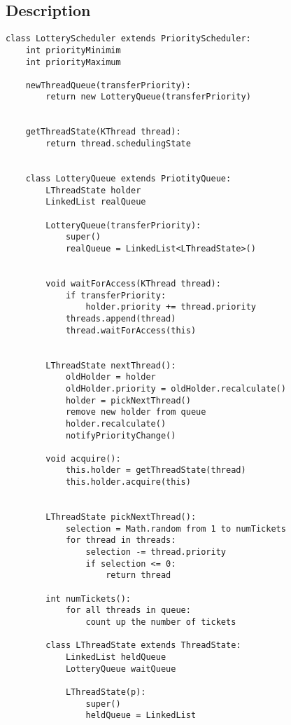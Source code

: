 \subsection{Description}
\begin{verbatim}
class LotteryScheduler extends PriorityScheduler:
    int priorityMinimim
    int priorityMaximum
    
    newThreadQueue(transferPriority):
        return new LotteryQueue(transferPriority)
    
    
    getThreadState(KThread thread):
        return thread.schedulingState
    
    
    class LotteryQueue extends PriotityQueue:
        LThreadState holder
        LinkedList realQueue
        
        LotteryQueue(transferPriority):
            super()
            realQueue = LinkedList<LThreadState>()
        
        
        void waitForAccess(KThread thread):
            if transferPriority:
                holder.priority += thread.priority          
            threads.append(thread)                              
            thread.waitForAccess(this)                          
            
        
        LThreadState nextThread():
            oldHolder = holder                      
            oldHolder.priority = oldHolder.recalculate()
            holder = pickNextThread()
            remove new holder from queue
            holder.recalculate()
            notifyPriorityChange()
        
        void acquire():
            this.holder = getThreadState(thread)                
            this.holder.acquire(this)                           

        
        LThreadState pickNextThread():
            selection = Math.random from 1 to numTickets        
            for thread in threads:                               
                selection -= thread.priority                    
                if selection <= 0:                              
                    return thread           
        
        int numTickets():
            for all threads in queue:
                count up the number of tickets 
                    
        class LThreadState extends ThreadState:
            LinkedList heldQueue
            LotteryQueue waitQueue
            
            LThreadState(p):
                super()
                heldQueue = LinkedList
                

\end{verbatim}
